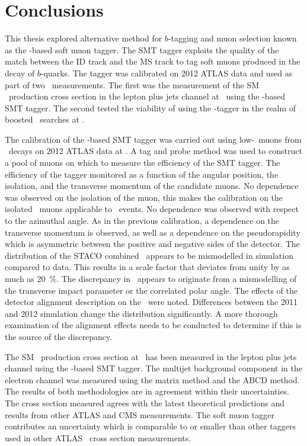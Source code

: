 \chapter{Conclusions} \label{ch:conclusions}

This thesis explored alternative method for $b$-tagging and muon selection known as the \xsm-based soft muon tagger. The SMT tagger exploits the quality of the match between the ID track and the MS track to tag soft muons produced in the decay of $b$-quarks. The tagger was calibrated on 2012 ATLAS data and used as part of two \ttbar\ measurements. The first was the measurement of the SM \ttbar\ production cross section in the lepton plus jets channel at \cmsS\ using the \xsm-based SMT tagger. The second tested the viability of using the \xsm-tagger in the realm of boosted \ttbar\ searches at \cmsE.

The calibration of the \xsm-based SMT tagger was carried out using low-\pt\ muons from \jpsi\ decays on 2012 ATLAS data at \cmsE. A tag and probe method was used to construct a pool of muons on which to measure the efficiency of the SMT tagger. The efficiency of the tagger monitored as a function of the angular position, the isolation, and the transverse momentum of the candidate muons. No dependence was observed on the isolation of the muon, this makes the calibration on the isolated \jpsi\ muons applicable to \ttbar\ events. No dependence was observed with respect to the azimuthal angle. As in the previous calibration, a dependence on the transverse momentum is observed, as well as a dependence on the pseudorapidity which is asymmetric between the positive and negative sides of the detector. The distribution of the STACO combined \xsd\ appears to be mismodelled in simulation compared to data. This results in a scale factor that deviates from unity by as much as \SI{20}{\percent}. The discrepancy in \xsd\ appears to originate from a mismodelling of the transverse impact parameter or the correlated polar angle. The effects of the detector alignment description on the \xsd\ were noted. Differences between the 2011 and 2012 simulation change the distribution significantly. A more thorough examination of the alignment effects needs to be conducted to determine if this is the source of the discrepancy.

The SM \ttbar\ production cross section at \cmsS\ has been measured in the lepton plus jets channel using the \xsm-based SMT tagger. The multijet background component in the electron channel was measured using the matrix method and the ABCD method. The results of both methodologies are in agreement within their uncertainties. The cross section measured agrees with the latest theoretical predictions and results from other ATLAS and CMS measurements. The soft muon tagger contributes an uncertainty which is comparable to or smaller than other taggers used in other ATLAS \ttbar\ cross section measurements.

